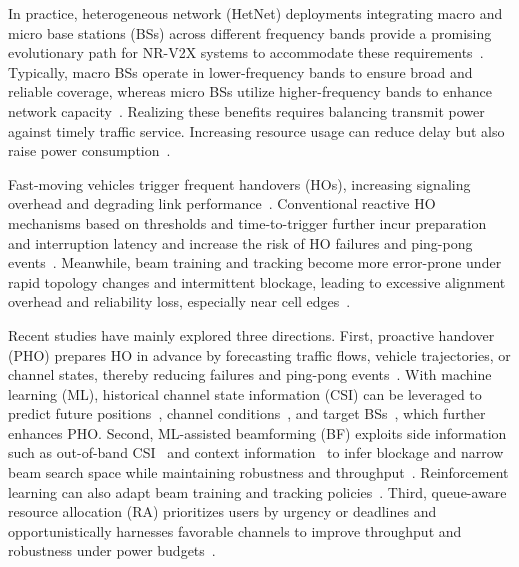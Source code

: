 \documentclass[10pt,journal,letterpaper]{journal_template/IEEEtran}
\newcommand{\rev}[1]{\textcolor{revisioncolor}{{}#1}}
\newif\ifshowdeletions
\newcommand{\currentdel}[1]{\ifshowdeletions\textcolor{deletioncolor}{\sout{#1}}\fi}
\theoremstyle{remark}
\begin{document}
In practice, heterogeneous network (HetNet) deployments integrating macro and micro base stations (BSs) across different frequency bands provide a promising evolutionary path for NR-V2X systems to accommodate these requirements~\cite{3GPP-TR-38.913}. Typically, macro BSs operate in lower-frequency bands to ensure broad and reliable coverage, whereas micro BSs utilize higher-frequency bands to enhance network capacity~\cite{xu2021survey}. 
\currentdel{Such a two-tier deployment can jointly improve throughput and coverage for V2X scenarios, while reducing data service latency and energy consumption through spatial reuse and shorter links}
\rev{Realizing these benefits requires balancing transmit power against timely traffic service. Increasing resource usage can reduce delay but also raise power consumption~\cite{niu2015}.}\par
\currentdel{However, vehicular HetNets face challenges under high mobility, with densely deployed small cells and links sensitive to blockage and beam misalignment.} Fast-moving vehicles trigger frequent handovers (HOs), increasing signaling overhead and degrading link performance~\cite{hasan2018frequent,nan2023}. 
Conventional reactive HO mechanisms based on thresholds and time-to-trigger further incur preparation and interruption latency and increase the risk of HO failures and ping-pong events~\cite{lee2020prediction}. 
Meanwhile, beam training and tracking become more error-prone under rapid topology changes and intermittent blockage, leading to excessive alignment overhead and reliability loss, especially near cell edges~\cite{elayach2014twc,alrabeiah2020tcom}. 
\currentdel{Although 5G-Advanced has introduced L1/L2-triggered mobility and fast conditional handover, energy-efficient {C}oordination of hand{O}ver, {B}eamforming and {R}esource {A}llocation (COBRA) in vehicular HetNets is still underexplored~\mbox{\cite{manalastas2020go, fiandrino2023cho,cho2022stanczak}}.}

Recent studies \rev{have mainly explored}\currentdel{mainly advance} three directions.
First, proactive handover (PHO) prepares HO in advance by forecasting traffic flows, vehicle trajectories, or channel states, thereby reducing failures and ping-pong events~\cite{lee2020prediction,sun2018energy}. With machine learning (ML), historical channel state information (CSI) can be leveraged to predict future positions~\cite{AEPHORA2025ICC}, channel conditions~\cite{ryden2023}, and target BSs~\cite{park2024mobility}, which further enhances PHO.
Second, ML-assisted beamforming (BF) exploits side information such as out-of-band CSI~\cite{alrabeiah2020tcom} and context information~\cite{va2017inverse} to infer blockage and narrow beam search space while maintaining robustness and throughput~\cite{wang2024beam}. Reinforcement learning can also adapt beam training and tracking policies~\cite{xie2024TVT}.
Third, queue-aware resource allocation (RA) prioritizes users by urgency or deadlines and opportunistically harnesses favorable channels to improve throughput and robustness under power budgets~\cite{liu2022queueaware,zhang2019qosaware}. 
\end{document}
